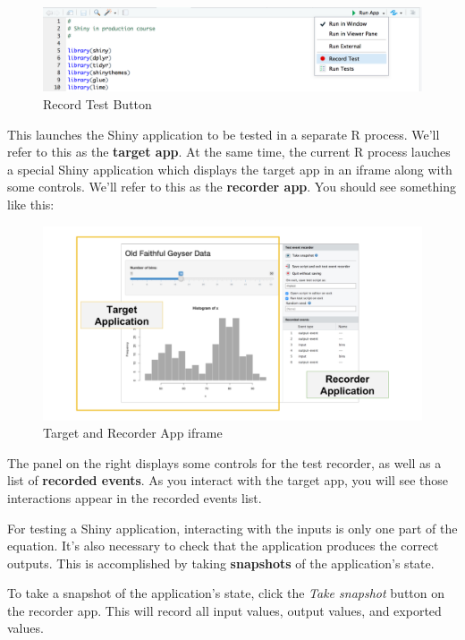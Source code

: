 \documentclass[]{book}
\theoremstyle{definition}
\theoremstyle{definition}
\theoremstyle{definition}
\theoremstyle{remark}
\begin{document}
\begin{figure}
\centering
\includegraphics{imgs/testing/record_test_button.png}
\caption{Record Test Button}
\end{figure}

This launches the Shiny application to be tested in a separate R
process. We'll refer to this as the \textbf{target app}. At the same
time, the current R process lauches a special Shiny application which
displays the target app in an iframe along with some controls. We'll
refer to this as the \textbf{recorder app}. You should see something
like this:

\begin{figure}
\centering
\includegraphics{imgs/testing/recorder_and_target.png}
\caption{Target and Recorder App iframe}
\end{figure}

The panel on the right displays some controls for the test recorder, as
well as a list of \textbf{recorded events}. As you interact with the
target app, you will see those interactions appear in the recorded
events list.

For testing a Shiny application, interacting with the inputs is only one
part of the equation. It's also necessary to check that the application
produces the correct outputs. This is accomplished by taking
\textbf{snapshots} of the application's state.

To take a snapshot of the application's state, click the \emph{Take
snapshot} button on the recorder app. This will record all input values,
output values, and exported values.
\end{document}
